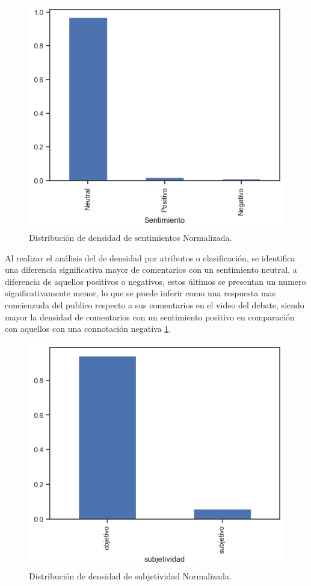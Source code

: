 \begin{figure}[h!]
	\centering
	\includegraphics[width=12cm]{Images/Densidad_sentimientos}
	\caption{Distribución de densidad de sentimientos Normalizada.}
	\label{fig:DDSN}
\end{figure}

Al realizar el análisis del de densidad por atributos o clasificación, se identifica una diferencia significativa mayor de comentarios con un sentimiento neutral, a diferencia de aquellos positivos o negativos, estos últimos se presentan un numero significativamente menor, lo que se puede inferir como una respuesta mas concienzuda del publico respecto a sus comentarios en el video del debate, siendo mayor la densidad de comentarios con un sentimiento positivo en comparación con aquellos con una connotación negativa \ref{fig:DDSN}.\\
 
\begin{figure}[h!]
	\centering
	\includegraphics[width=12cm]{Images/Densidad_subjetividad}
	\caption{Distribución de densidad de subjetividad Normalizada.}
	\label{fig:DDSbN}
\end{figure}

